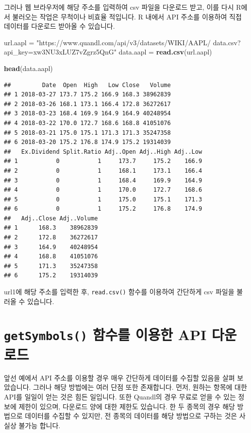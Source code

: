 \documentclass[12pt,]{book}
\newenvironment{Shaded}{\begin{snugshade}}{\end{snugshade}}
\newcommand{\KeywordTok}[1]{\textcolor[rgb]{0.13,0.29,0.53}{\textbf{#1}}}
\newcommand{\NormalTok}[1]{#1}
\newcommand{\StringTok}[1]{\textcolor[rgb]{0.31,0.60,0.02}{#1}}
\begin{document}
그러나 웹 브라우저에 해당 주소를 입력하여 csv 파일을 다운로드 받고, 이를 다시 R에서 불러오는 작업은 무척이나 비효율 적입니다. R 내에서 API 주소를 이용하여 직접 데이터를 다운로드 받아올 수 있습니다.

\begin{Shaded}
\begin{Highlighting}[]
\NormalTok{url.aapl =}\StringTok{ "https://www.quandl.com/api/v3/datasets/WIKI/AAPL/}
\StringTok{data.csv?api_key=xw3NU3xLUZ7vZgrz5QnG"}
\NormalTok{data.aapl =}\StringTok{ }\KeywordTok{read.csv}\NormalTok{(url.aapl)}

\KeywordTok{head}\NormalTok{(data.aapl)}
\end{Highlighting}
\end{Shaded}

\begin{verbatim}
##         Date  Open  High   Low Close   Volume
## 1 2018-03-27 173.7 175.2 166.9 168.3 38962839
## 2 2018-03-26 168.1 173.1 166.4 172.8 36272617
## 3 2018-03-23 168.4 169.9 164.9 164.9 40248954
## 4 2018-03-22 170.0 172.7 168.6 168.8 41051076
## 5 2018-03-21 175.0 175.1 171.3 171.3 35247358
## 6 2018-03-20 175.2 176.8 174.9 175.2 19314039
##   Ex.Dividend Split.Ratio Adj..Open Adj..High Adj..Low
## 1           0           1     173.7     175.2    166.9
## 2           0           1     168.1     173.1    166.4
## 3           0           1     168.4     169.9    164.9
## 4           0           1     170.0     172.7    168.6
## 5           0           1     175.0     175.1    171.3
## 6           0           1     175.2     176.8    174.9
##   Adj..Close Adj..Volume
## 1      168.3    38962839
## 2      172.8    36272617
## 3      164.9    40248954
## 4      168.8    41051076
## 5      171.3    35247358
## 6      175.2    19314039
\end{verbatim}

url1에 해당 주소를 입력한 후, \texttt{read.csv()} 함수를 이용하여 간단하게 csv 파일을 불러올 수 있습니다.

\hypertarget{getsymbols---api-}{%
\section{\texorpdfstring{\texttt{getSymbols()} 함수를 이용한 API 다운로드}{getSymbols() 함수를 이용한 API 다운로드}}\label{getsymbols---api-}}

앞선 예에서 API 주소를 이용할 경우 매우 간단하게 데이터를 수집할 있음을 살펴 보았습니다. 그러나 해당 방법에는 여러 단점 또한 존재합니다. 먼저, 원하는 항목에 대한 API를 일일이 얻는 것은 힘든 일입니다. 또한 Quandl의 경우 무료로 얻을 수 있는 정보에 제한이 있으며, 다운로드 양에 대한 제한도 있습니다. 한 두 종목의 경우 해당 방법으로 데이터를 수집할 수 있지만, 전 종목의 데이터를 해당 방법으로 구하는 것은 사실상 불가능 합니다.
\end{document}
